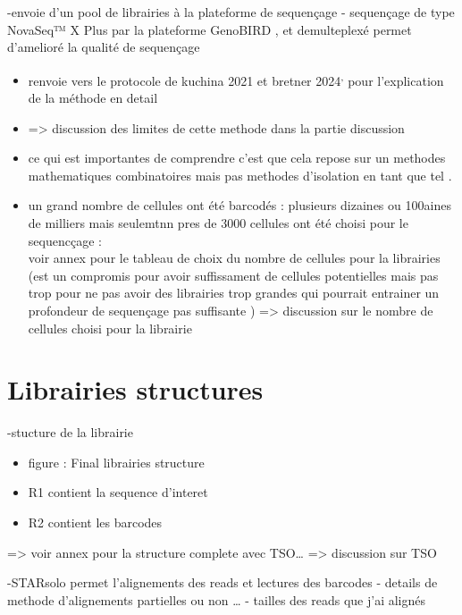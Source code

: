 \documentclass[
  11pt,
  a4paper,
]{report}
\begin{document}
-envoie d'un pool de librairies à la plateforme de sequençage -
sequençage de type NovaSeq™ X Plus par la plateforme GenoBIRD , et
demulteplexé permet d'amelioré la qualité de sequençage

\begin{itemize}
\item
  renvoie vers le protocole de kuchina 2021 et bretner
  2024\textsuperscript{,}
  pour l'explication de la méthode en detail
\item
  =\textgreater{} discussion des limites de cette methode dans la partie
  discussion
\item
  ce qui est importantes de comprendre c'est que cela repose sur un
  methodes mathematiques combinatoires mais pas methodes d'isolation en
  tant que tel .
\item
  un grand nombre de cellules ont été barcodés : plusieurs dizaines ou
  100aines de milliers mais seulemtnn pres de 3000 cellules ont été
  choisi pour le sequencçage :\\
  voir annex pour le tableau de choix du nombre de cellules pour la
  librairies (est un compromis pour avoir suffissament de cellules
  potentielles mais pas trop pour ne pas avoir des librairies trop
  grandes qui pourrait entrainer un profondeur de sequençage pas
  suffisante ) =\textgreater{} discussion sur le nombre de cellules
  choisi pour la librairie
\end{itemize}

\section{Librairies structures}\label{librairies-structures}

-stucture de la librairie

\begin{itemize}
\item
  figure : Final librairies structure
\item
  R1 contient la sequence d'interet
\item
  R2 contient les barcodes
\end{itemize}

=\textgreater{} voir annex pour la structure complete avec TSO\ldots{}
=\textgreater{} discussion sur TSO

-STARsolo permet l'alignements des reads et lectures des barcodes -
details de methode d'alignements partielles ou non \ldots{} - tailles
des reads que j'ai alignés
\end{document}
